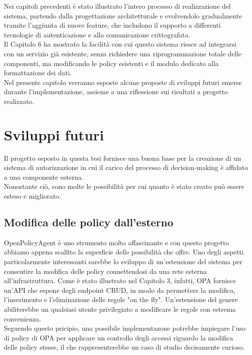 Nei capitoli precedenti è stato illustrato l'intero processo di realizzazione del sistema, partendo dalla
progettazione architetturale e evolvendolo gradualmente tramite l'aggiunta di nuove feature, che includono il supporto a 
differenti tecnologie di autenticazione e alla comunicazione crittografata. 
\\ Il Capitolo 6 ha mostrato la facilità 
con cui questo sistema riesce ad integrarsi con un servizio già esistente, senza richiedere una 
riprogrammazione totale delle componenti, ma modificando le policy esistenti e il modulo dedicato alla formattazione dei dati. 
\\ Nel presente capitolo verranno esposte alcune proposte di sviluppi futuri emerse durante l'implementazione, assieme a una riflessione
 sui risultati a progetto realizzato. 

\section{Sviluppi futuri}
Il progetto esposto in questa tesi fornisce una buona base per la creazione di un sistema di autorizzazione 
in cui il carico del processo di decision-making è affidato a una componente esterna.  
\\ Nonostante ciò, sono molte le possibilità per cui quanto è stato creato può essere esteso e migliorato. 

\subsection{Modifica delle policy dall'esterno}
OpenPolicyAgent è uno strumento molto affascinante e con questo progetto abbiamo 
appena scalfito la superficie delle possibilità che offre. Uno degli aspetti particolarmente interessanti 
sarebbe lo sviluppo di un'estensione del sistema per consentire la modifica delle policy connettendosi da una 
rete esterna all'infrastruttura. Come è stato illustrato nel Capitolo 3, infatti, OPA fornisce un'API che espone degli 
endpoint CRUD, in modo da permettere la modifica, l'inserimento e l'eliminazione delle regole "on the fly".
Un'estensione del genere abiliterebbe un qualsiasi utente privilegiato a modificare le regole con estrema
 convenienza.   
\\ Seguendo questo pricipio, una possibile implementazone potrebbe impiegare l'uso di policy di OPA per applicare un controllo degli accessi 
riguardo la modifica delle policy stesse, il che rappresenterebbe un caso di studio decisamente curioso. 

